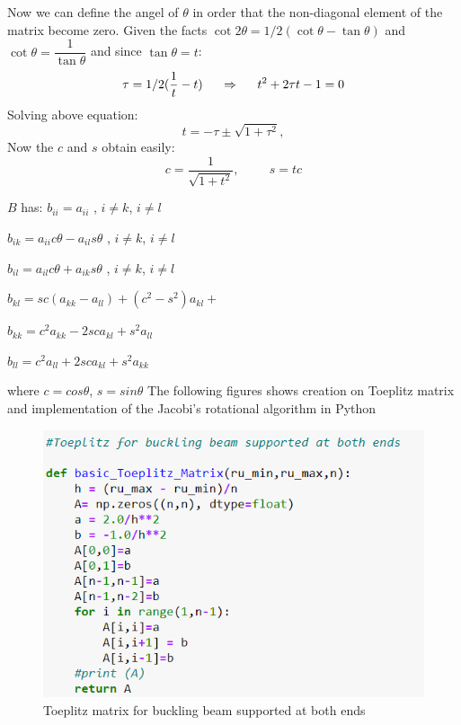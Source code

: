 \documentclass{article}
\begin{document}
Now we can define the angel of $\theta$ in order that the non-diagonal element of the matrix become zero.
Given the facts $\cot 2\theta=1/2(\cot \theta-\tan\theta)$ and $\cot\theta = \dfrac{1}{\tan\theta}$ and since $\tan\theta = t$:
\begin{equation*}\tau = 1/2(\dfrac{1}{t}- t)\hspace{0.5cm}\Rightarrow\hspace{0.5cm} t^2+2\tau t-1= 0
\end{equation*}
Solving above equation:
\begin{equation*}
  t = -\tau \pm \sqrt{1+\tau^2},
\end{equation*}
Now the $c$ and $s$ obtain easily:
\begin{equation*}
   c = \frac{1}{\sqrt{1+t^2}},\hspace{1cm} s=tc
\end{equation*}


$B$ has:
$b_{ii}=a_{ii} $ , $ i\neq k $, $i\neq l$

$b_{ik}=a_{ii} c\theta -a_{il} s\theta$ , $ i\neq k $, $i\neq l$

$b_{il}=a_{il} c\theta +a_{ik} s\theta$ , $ i\neq k $, $i\neq l$

$b_{kl} = sc(a_{kk} - a_{ll})+(c^{2}-s^2)a_{kl} + $

$b_{kk} = c^2a_{kk}-2sca_{kl} + s^2a_{ll}    $

$b_{ll} = c^2a_{ll}+2sca_{kl}+s^2a_{kk}    $

where $c = cos\theta$, $s = sin\theta$
The following figures shows  creation on Toeplitz matrix and implementation of the Jacobi's rotational algorithm in Python
\begin{figure}[H]
  \includegraphics[width=\linewidth]{toeplitzbuckbeam.png}
  \caption{Toeplitz matrix for buckling beam supported at both ends}
  \label{fig:jacobialg}
\end{figure}
\end{document}
